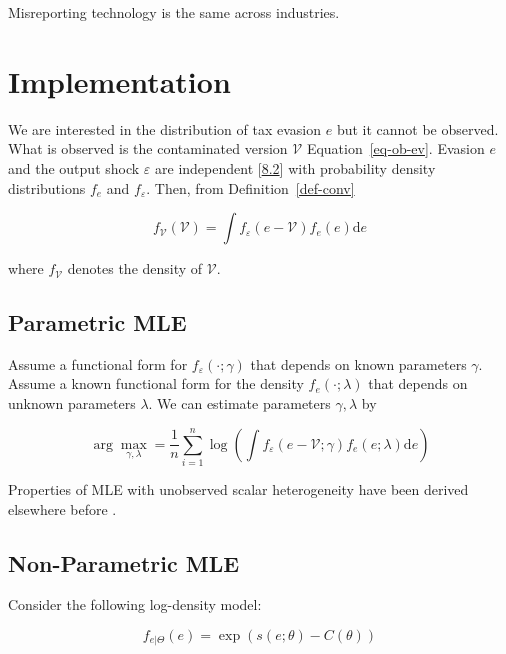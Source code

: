 \documentclass[
  12pt]{article}
\theoremstyle{definition}
\theoremstyle{remark}
\newenvironment{fbx}[3]{\begin{tcolorbox}[enhanced, breakable,%
attach boxed title to top*={xshift=1.4pt},
boxed title style={boxrule=0.0mm, fuzzy shadow={1pt}{-1pt}{0mm}{0.1mm}{gray}, arc=.3em, rounded corners=east, sharp corners=west}, colframe=#1-color2, colbacktitle=#1-color1, colback = white, coltitle=black,  titlerule=0mm, toprule=0pt, bottomrule=.7pt, leftrule=.3em, rightrule=0pt, outer arc=.3em,  arc=0pt,	 sharp corners = east, left=.5em, bottomtitle=1mm, toptitle=1mm,title=\textbf{#2}\hspace{0.5em}{#3}]}
{\end{tcolorbox}}
\begin{document}
\label{ass-upstream}
\begin{fbx}{Assumption}{Assumption 9.3: }{Misreporting Technology}
\label{ass-upstream}
Misreporting technology is the same across industries.

\end{fbx}

\section{Implementation}\label{implementation}

We are interested in the distribution of tax evasion \(e\) but it cannot
be observed. What is observed is the contaminated version
\(\mathcal{V}\) Equation~\ref{eq-ob-ev}. Evasion \(e\) and the output
shock \(\varepsilon\) are independent {[}\hyperref[ass-ind]{8.2}{]} with
probability density distributions \(f_e\) and \(f_{\varepsilon}\). Then,
from Definition~\ref{def-conv}

\[
f_{\mathcal{V}}(\mathcal{V})=\int f_{\varepsilon}(e-\mathcal{V})f_e(e)\text{d}e
\]

where \(f_{\mathcal{V}}\) denotes the density of \(\mathcal{V}\).

\subsection{Parametric MLE}\label{parametric-mle}

Assume a functional form for \(f_{\varepsilon}(\cdot;\gamma)\) that
depends on known parameters \(\gamma\). Assume a known functional form
for the density \(f_e(\cdot;\lambda)\) that depends on unknown
parameters \(\lambda\). We can estimate parameters \(\gamma, \lambda\)
by

\[
\arg \max_{\gamma,\lambda}=\frac{1}{n}\sum_{i=1}^n \log \left(\int f_{\varepsilon}(e-\mathcal{V};\gamma)f_e(e;\lambda)\text{d}e\right)
\]

Properties of MLE with unobserved scalar heterogeneity have been derived
elsewhere before \citep{Chen2007, Yi2021}.

\subsection{Non-Parametric MLE}\label{non-parametric-mle}

Consider the following log-density model:

\[
f_{e|\Theta}(e)=\exp(s(e;\theta)-C(\theta))
\]
\end{document}
